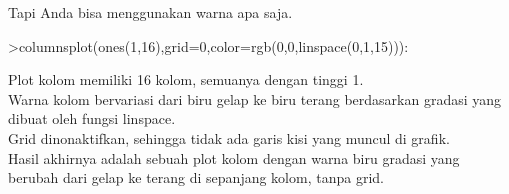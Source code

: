 \documentclass{article}
\begin{document}
\begin{eulernotebook}
\begin{eulercomment}
\begin{eulercomment}
\begin{eulercomment}
\begin{eulercomment}
\begin{eulercomment}
\begin{eulercomment}
\begin{eulercomment}
Tapi Anda bisa menggunakan warna apa saja.
\end{eulercomment}
\begin{eulerprompt}
>columnsplot(ones(1,16),grid=0,color=rgb(0,0,linspace(0,1,15))):
\end{eulerprompt}
\begin{eulercomment}
Plot kolom memiliki 16 kolom, semuanya dengan tinggi 1.\\
Warna kolom bervariasi dari biru gelap ke biru terang berdasarkan
gradasi yang dibuat oleh fungsi linspace.\\
Grid dinonaktifkan, sehingga tidak ada garis kisi yang muncul di
grafik.\\
Hasil akhirnya adalah sebuah plot kolom dengan warna biru gradasi yang
berubah dari gelap ke terang di sepanjang kolom, tanpa grid.


\end{eulercomment}
\end{eulercomment}
\end{eulercomment}
\end{eulercomment}
\end{eulercomment}
\end{eulercomment}
\end{eulercomment}
\end{eulernotebook}
\end{document}
